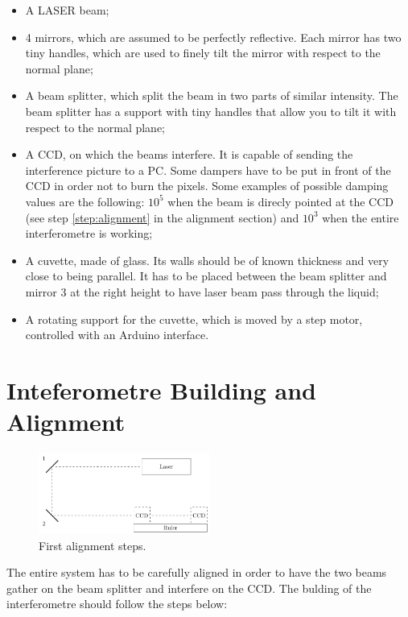 \documentclass[a4paper, 12pt]{article}
\begin{document}
\begin{itemize}
\item A LASER beam; %
\item 4 mirrors, which are assumed to be perfectly reflective. Each mirror has two tiny handles, which are used to finely tilt the mirror with respect to the normal plane;
\item A beam splitter, which split the beam in two parts of similar intensity. The beam splitter has a support with tiny handles that allow you to tilt it with respect to the normal plane; 
\item A CCD, on which the beams interfere. It is capable of sending the interference picture to a PC. Some dampers have to be put in front of the CCD in order not to burn the pixels. Some examples of possible damping values are the following: $10^5$ when the beam is direcly pointed at the CCD (see step \ref{step:alignment} in the alignment section) and $10^3$ when the entire interferometre is working; 
\item A cuvette, made of glass. %
Its walls should be of known thickness and very close to being parallel.
It has to be placed between the beam splitter and mirror 3 at the right height to have laser beam pass through the liquid;
\item A rotating support for the cuvette, which is moved by a step motor, controlled with an Arduino interface.
\end{itemize}

\section{Inteferometre Building and Alignment}
\begin{figure}[hbt]
    \centering
    \includegraphics[width=0.5\textwidth]{img/align.pdf}
    \caption{First alignment steps.}
    \label{fig:align}
\end{figure}
The entire system has to be carefully aligned in order to have the two beams gather on the beam splitter and interfere on the CCD. The bulding of the interferometre should follow the steps below: 
\end{document}
